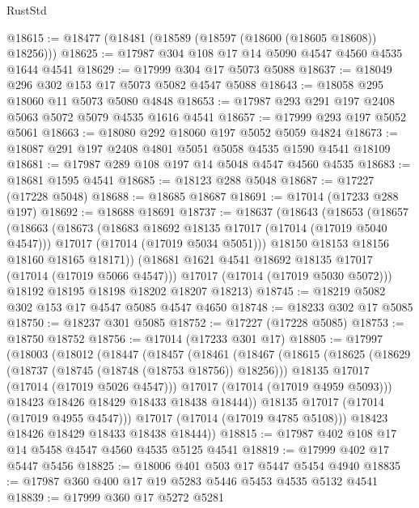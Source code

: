 \begin{lexlean}{RustStd}
\begin{coremodule}
{\begin{coremodule}
{{{{{{{{{{{{{{{{{{{{{{{{{{{{{{{{{{{{{{{{{{{{{{{{{{{{{{{@18615 := @18477 (@18481 (@18589 (@18597 (@18600 (@18605 @18608)) @18256)))
@18625 := @17987 @304 @108 @17 @14 @5090 @4547 @4560 @4535 @1644 @4541
@18629 := @17999 @304 @17 @5073 @5088
@18637 := @18049 @296 @302 @153 @17 @5073 @5082 @4547 @5088
@18643 := @18058 @295 @18060 @11 @5073 @5080 @4848
@18653 := @17987 @293 @291 @197 @2408 @5063 @5072 @5079 @4535 @1616 @4541
@18657 := @17999 @293 @197 @5052 @5061
@18663 := @18080 @292 @18060 @197 @5052 @5059 @4824
@18673 := @18087 @291 @197 @2408 @4801 @5051 @5058 @4535 @1590 @4541 @18109
@18681 := @17987 @289 @108 @197 @14 @5048 @4547 @4560 @4535
@18683 := @18681 @1595 @4541
@18685 := @18123 @288 @5048
@18687 := @17227 (@17228 @5048)
@18688 := @18685 @18687
@18691 := @17014 (@17233 @288 @197)
@18692 := @18688 @18691
@18737 := @18637
    (@18643
      (@18653
        (@18657
          (@18663
            (@18673
              (@18683 @18692 @18135 @17017 (@17014 (@17019 @5040 @4547)))
              @17017
              (@17014 (@17019 @5034 @5051)))
            @18150
            @18153
            @18156
            @18160
            @18165
            @18171))
        (@18681 @1621 @4541 @18692 @18135 @17017 (@17014 (@17019 @5066 @4547)))
        @17017
        (@17014 (@17019 @5030 @5072)))
      @18192
      @18195
      @18198
      @18202
      @18207
      @18213)
@18745 := @18219 @5082 @302 @153 @17 @4547 @5085 @4547 @4650
@18748 := @18233 @302 @17 @5085
@18750 := @18237 @301 @5085
@18752 := @17227 (@17228 @5085)
@18753 := @18750 @18752
@18756 := @17014 (@17233 @301 @17)
@18805 := @17997
    (@18003
      (@18012
        (@18447
          (@18457
            (@18461
              (@18467
                (@18615
                  (@18625
                    (@18629 (@18737 (@18745 (@18748 (@18753 @18756)) @18256)))
                    @18135
                    @17017
                    (@17014 (@17019 @5026 @4547)))
                  @17017
                  (@17014 (@17019 @4959 @5093)))
                @18423
                @18426
                @18429
                @18433
                @18438
                @18444))
            @18135
            @17017
            (@17014 (@17019 @4955 @4547)))
          @17017
          (@17014 (@17019 @4785 @5108)))
        @18423
        @18426
        @18429
        @18433
        @18438
        @18444))
@18815 := @17987 @402 @108 @17 @14 @5458 @4547 @4560 @4535 @5125 @4541
@18819 := @17999 @402 @17 @5447 @5456
@18825 := @18006 @401 @503 @17 @5447 @5454 @4940
@18835 := @17987 @360 @400 @17 @19 @5283 @5446 @5453 @4535 @5132 @4541
@18839 := @17999 @360 @17 @5272 @5281
}}}}}}}}}}}}}}}}}}}}}}}}}}}}}}}}}}}}}}}}}}}}}}}}}}}}}}}
\end{coremodule}}
\end{coremodule}
\end{lexlean}
